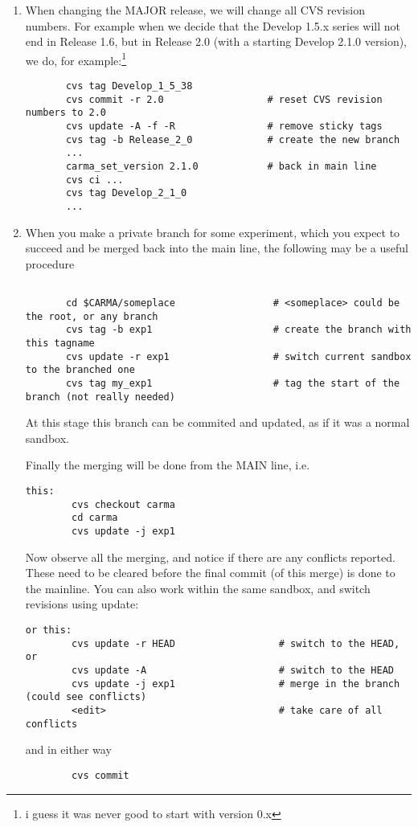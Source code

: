 \documentclass{article}
\begin{document}
\begin{enumerate}
\item
When changing the MAJOR release, we will change all CVS revision numbers.
For example when we decide that the Develop 1.5.x series will not end
in Release 1.6, but in Release 2.0 (with a starting Develop 2.1.0 version),
we do, for example:\footnote{i guess it was never good to start with version 0.x}

\footnotesize
\begin{verbatim}
       cvs tag Develop_1_5_38
       cvs commit -r 2.0                  # reset CVS revision numbers to 2.0
       cvs update -A -f -R                # remove sticky tags
       cvs tag -b Release_2_0             # create the new branch
       ...
       carma_set_version 2.1.0            # back in main line
       cvs ci ...
       cvs tag Develop_2_1_0
       ...
\end{verbatim}
\normalsize

\item
When you make a private branch for some experiment, which you expect to succeed
and be merged back into the main line, the following may be a useful procedure

\footnotesize\begin{verbatim}

       cd $CARMA/someplace                 # <someplace> could be the root, or any branch
       cvs tag -b exp1                     # create the branch with this tagname
       cvs update -r exp1                  # switch current sandbox to the branched one
       cvs tag my_exp1                     # tag the start of the branch (not really needed)
\end{verbatim}\normalsize %
At this stage this branch can be commited and updated, as if it was a normal sandbox.

Finally the merging will be done from the MAIN line, i.e.
\footnotesize\begin{verbatim}
this:
        cvs checkout carma
        cd carma
        cvs update -j exp1
\end{verbatim}\normalsize
Now observe all the merging, and notice if there are any conflicts reported. These
need to be cleared before the final commit (of this merge) is done to the mainline.
You can also work within the same sandbox, and switch revisions using update:

\footnotesize\begin{verbatim}
or this:
        cvs update -r HEAD                  # switch to the HEAD, or
        cvs update -A                       # switch to the HEAD
        cvs update -j exp1                  # merge in the branch (could see conflicts)
        <edit>                              # take care of all conflicts
\end{verbatim}\normalsize
and in either way
\footnotesize
\begin{verbatim}
        cvs commit
\end{verbatim}
\normalsize


\end{enumerate}
\end{document}
